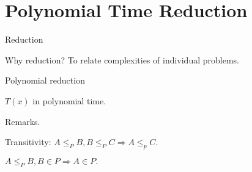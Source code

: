 \section{Polynomial Time Reduction}

\begin{frame}{Reduction}
  \begin{alertblock}{Why reduction?}
    To relate complexities of individual problems.
  \end{alertblock}

  \vspace{0.40cm}
  \begin{definition}[Reduction.]
  \end{definition}
\end{frame}
\begin{frame}{Polynomial reduction}
  \begin{definition}
    $T(x)$ in polynomial time.
  \end{definition}
  
  \begin{alertblock}{Remarks.}
    \begin{theorem}
      Transitivity: $A \le_{P} B, B \le_{P} C \Rightarrow A \le_{p} C.$
    \end{theorem}
    
    \begin{theorem}
      $A \le_{P} B, B \in P \Rightarrow A \in P.$  
    \end{theorem}
  \end{alertblock}
\end{frame}
